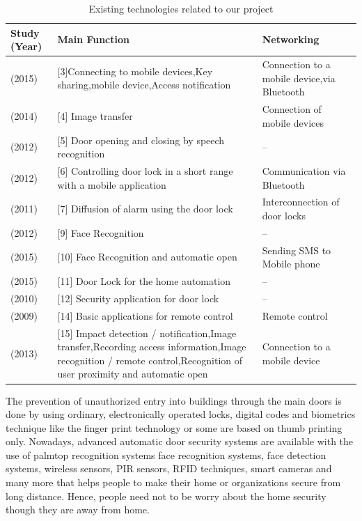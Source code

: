 \documentclass[twoside,a4paper,16pt]{book}
\begin{document}
{\begin{center}
	\begin{table}[h!]
		\centering
		\begin{tabular}{|p{2cm}|p{6cm}|p{5cm}|}
			\hline
	Study (Year) & Main Function & Networking\\
	\hline	
	(2015) & [3]Connecting to mobile devices,Key sharing,mobile device,Access notification & Connection to a mobile device,via Bluetooth\\
	\hline
	(2014) & [4] Image transfer & Connection of mobile devices\\
	\hline
	(2012) & [5] Door opening and closing by speech recognition & –	\\
	\hline
	(2012) & [6] Controlling door lock in a short range with a mobile application & Communication via Bluetooth\\
	\hline
	(2011) & [7] Diffusion of alarm using the door lock & Interconnection of door locks\\
	\hline
	(2012) & [9] Face Recognition & –\\
	\hline
	(2015) & [10] Face Recognition and automatic open & Sending SMS to Mobile phone\\
	\hline
	(2015) & [11] Door Lock for the home automation & –\\
	\hline
	(2010) & [12] Security application for door lock & –\\
	\hline
	(2009) & [14] Basic applications for remote control & Remote control\\
	\hline
	(2013) & [15] Impact detection / notification,Image transfer,Recording access information,Image recognition / remote control,Recognition of user proximity and automatic open & Connection to a	mobile device\\
	\hline	
		\end{tabular}
		\caption{Existing  technologies related to our project}	
	\end{table}
\end{center}
The prevention of unauthorized entry into buildings
through the main doors is done by using ordinary,
electronically operated locks, digital codes and biometrics
technique like the finger print technology or some are
based on thumb printing only. Nowadays, advanced
automatic door security systems are available with the use
of palmtop recognition systems face recognition systems,
face detection systems, wireless sensors, PIR sensors,
RFID techniques, smart cameras and many more that helps
people to make their home or organizations secure from
long distance. Hence, people need not to be worry about
the home security though they are away from home.
}
\end{document}
